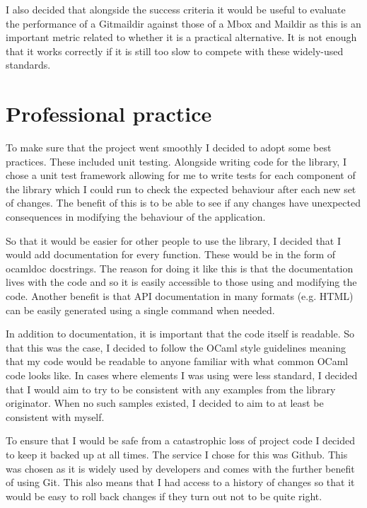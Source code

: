 I also decided that alongside the success criteria it would be useful to evaluate the performance of a Gitmaildir against those of a Mbox and Maildir as this is an important metric related to whether it is a practical alternative. It is not enough that it works correctly if it is still too slow to compete with these widely-used standards.

\section{Professional practice}

To make sure that the project went smoothly I decided to adopt some best practices. These included unit testing. Alongside writing code for the library, I chose a unit test framework allowing for me to write tests for each component of the library which I could run to check the expected behaviour after each new set of changes. The benefit of this is to be able to see if any changes have unexpected consequences in modifying the behaviour of the application.

So that it would be easier for other people to use the library, I decided that I would add documentation for every function. These would be in the form of ocamldoc docstrings. The reason for doing it like this is that the documentation lives with the code and so it is easily accessible to those using and modifying the code. Another benefit is that API documentation in many formats (e.g. HTML) can be easily generated using a single command when needed.

In addition to documentation, it is important that the code itself is readable. So that this was the case, I decided to follow the OCaml style guidelines\cite{ocaml_guidelines} meaning that my code would be readable to anyone familiar with what common OCaml code looks like. In cases where elements I was using were less standard, I decided that I would aim to try to be consistent with any examples from the library originator. When no such samples existed, I decided to aim to at least be consistent with myself.

To ensure that I would be safe from a catastrophic loss of project code I decided to keep it backed up at all times. The service I chose for this was Github. This was chosen as it is widely used by developers and comes with the further benefit of using Git. This also means that I had access to a history of changes so that it would be easy to roll back changes if they turn out not to be quite right.
